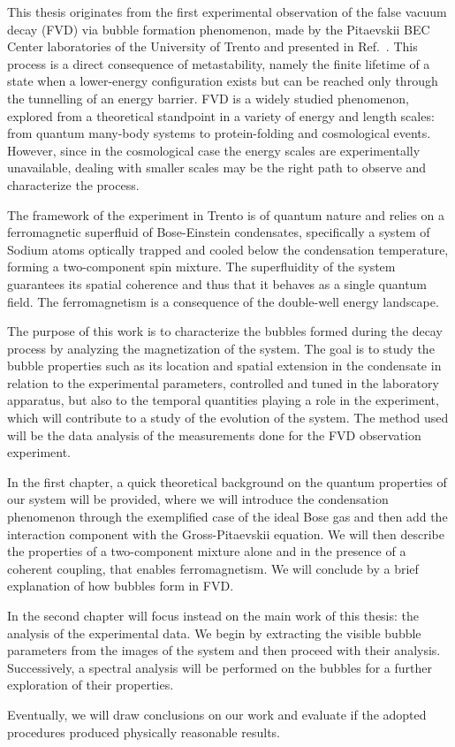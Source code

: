 This thesis originates from the first experimental observation of the false vacuum decay (FVD) via bubble formation phenomenon, made by the Pitaevskii BEC Center laboratories of the University of Trento and presented in Ref.\ \cite{zenesini2024false}. This process is a direct consequence of metastability, namely the finite lifetime of a state when a lower-energy configuration exists but can be reached only through the tunnelling of an energy barrier. FVD is a widely studied phenomenon, explored from a theoretical standpoint in a variety of energy and length scales: from quantum many-body systems to protein-folding and cosmological events. However, since in the cosmological case the energy scales are experimentally unavailable, dealing with smaller scales may be the right path to observe and characterize the process.

The framework of the experiment in Trento is of quantum nature and relies on a ferromagnetic superfluid of Bose-Einstein condensates, specifically a system of Sodium atoms optically trapped and cooled below the condensation temperature, forming a two-component spin mixture. The superfluidity of the system guarantees its spatial coherence and thus that it behaves as a single quantum field. The ferromagnetism is a consequence of the double-well energy landscape.

The purpose of this work is to characterize the bubbles formed during the decay process by analyzing the magnetization of the system. The goal is to study the bubble properties such as its location and spatial extension in the condensate in relation to the experimental parameters, controlled and tuned in the laboratory apparatus, but also to the temporal quantities playing a role in the experiment, which will contribute to a study of the evolution of the system. The method used will be the data analysis of the measurements done for the FVD observation experiment.

In the first chapter, a quick theoretical background on the quantum properties of our system will be provided, where we will introduce the condensation phenomenon through the exemplified case of the ideal Bose gas and then add the interaction component with the Gross-Pitaevskii equation. We will then describe the properties of a two-component mixture alone and in the presence of a coherent coupling, that enables ferromagnetism. We will conclude by a brief explanation of how bubbles form in FVD.

In the second chapter will focus instead on the main work of this thesis: the analysis of the experimental data. We begin by extracting the visible bubble parameters from the images of the system and then proceed with their analysis. Successively, a spectral analysis will be performed on the bubbles for a further exploration of their properties.

Eventually, we will draw conclusions on our work and evaluate if the adopted procedures produced physically reasonable results.